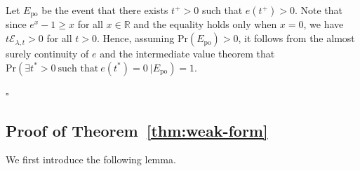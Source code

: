 \documentclass[final]{siamltex}
\begin{document}
\begin{appendices}
Let $E_{\text{po}}$ be the event that there exists $t^+ > 0$ such that $e(t^+) > 0$.
Note that since $e^x-1 \ge x$ for all $x \in \mathbb{R}$ and the equality holds only when $x=0$, we have $t\mathcal{E}_{\lambda,t} > 0$ for all $t > 0$.
Hence, assuming $\text{Pr}(E_\text{po}) > 0$, it follows from 
the almost surely continuity of $e$ and the intermediate value theorem that 
$\text{Pr}(\exists t^* > 0 \ \text{such that} \ e(t^*) = 0 \ | E_\text{po}) = 1$.

\hfill $\square$

\subsection{ Proof of Theorem~\ref{thm:weak-form}}\label{app:proof_thm43} 

We first introduce the following lemma. 


\end{appendices}
\end{document}
